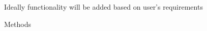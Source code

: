 \NEWSEC

\subsection{\ssRequests}

\begin{frame}[fragile,label=ss-requests] 
\secframetitle{\ssRequests}
\framesubtitle{}

Ideally functionality will be added based on user's requirements

Methods



\end{frame}
